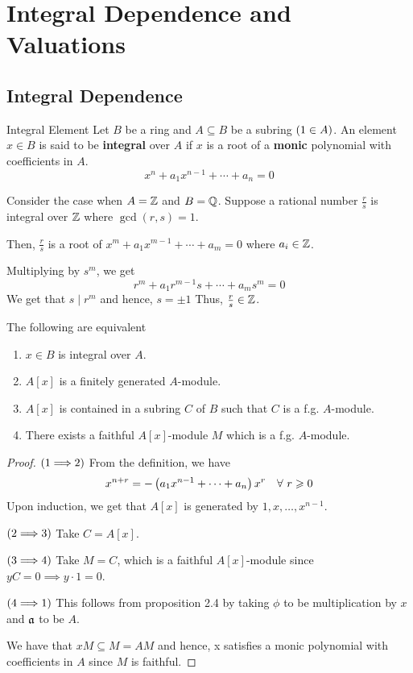 \chapter{Integral Dependence and Valuations}
\label{ch:book_05_integral_dependence_and_valuations}

\section{Integral Dependence}

\begin{definition}{Integral Element}{}
	Let \(B\) be a ring and \(A \subseteq B\) be a subring \(\left( 1 \in A \right)\).
	An element \(x \in B\) is said to be \textbf{integral} over \(A\) if \(x\)
	is a root of a \textbf{monic} polynomial with coefficients in \(A\).
	\[
		x^n + a_1 x^{n-1} + \cdots + a_n = 0
	\]
\end{definition}

Consider the case when \(A = \ZZ\) and \(B = \QQ\).
Suppose a rational number \(\frac{r}{s}\) is integral over \(\ZZ\)
where \(\gcd(r, s) = 1\).

Then, \(\frac{r}{s}\) is a root of \(x^m + a_1 x^{m-1} + \cdots + a_m = 0\)
where \(a_i \in \ZZ\).

Multiplying by \(s^m\), we get
\[
	r^m + a_1 r^{m-1} s + \cdots + a_m s^m = 0
\]
We get that \(s \mid r^m\) and hence, \(s = \pm 1\)
Thus, \(\frac{r}{s} \in \ZZ\).

\begin{proposition}{}{}
\label{prop:5.1}
	The following are equivalent
	\begin{enumerate}
		\item \(x \in B\) is integral over \(A\).
		\item \(A[x]\) is a finitely generated \(A\)-module.
		\item \(A[x]\) is contained in a subring \(C\) of \(B\) such that
			\(C\) is a f.g. \(A\)-module.
		\item There exists a faithful \(A[x]\)-module \(M\) which is a
			f.g. \(A\)-module.
	\end{enumerate}
\end{proposition}
\begin{proof}
	\(\left( 1 \Longrightarrow 2 \right)\) From the definition, we have
	\[
		x^{n + r} = - \left( a_1 x^{n-1} + \cdots + a_n \right) x^r
		\quad \forall\ r \geqslant 0
	\]
	Upon induction, we get that
	\(A[x]\) is generated by \(1, x, \ldots, x^{n-1}\).

	\(\left( 2 \Longrightarrow 3 \right)\) Take \(C = A[x]\).

	\(\left( 3 \Longrightarrow 4 \right)\) Take \(M = C\), which is a faithful
	\(A[x]\)-module since \(yC = 0 \implies y \cdot 1 = 0\).

	\(\left( 4 \Longrightarrow 1 \right)\) This follows from proposition 2.4 by
	taking \(\phi\) to be multiplication by \(x\) and \(\mathfrak{a}\) to be \(A\).

	We have that \(xM \subseteq M = AM\) and hence, x satisfies a monic
	polynomial with coefficients in \(A\) since \(M\) is faithful.
\end{proof}


